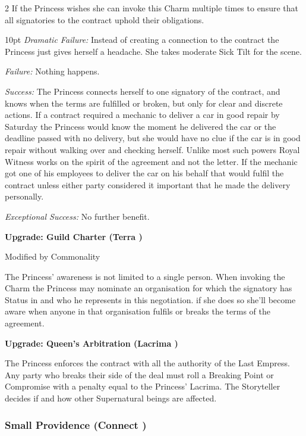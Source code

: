\begin{multicols}{2}
If the Princess wishes she can invoke this Charm multiple times to ensure that all signatories to the contract uphold their obligations. 

\begin{myindentpar}{10pt}    \emph{Dramatic Failure:} Instead of creating a connection to the contract the Princess just gives herself a headache. She takes moderate Sick Tilt for the scene. 

\emph{Failure:} Nothing happens. 

\emph{Success:} The Princess connects herself to one signatory of the contract, and knows when the terms are fulfilled or broken, but only for clear and discrete actions. If a contract required a mechanic to deliver a car in good repair by Saturday the Princess would know the moment he delivered the car or the deadline passed with no delivery, but she would have no clue if the car is in good repair without walking over and checking herself. Unlike most such powers Royal Witness works on the spirit of the agreement and not the letter. If the mechanic got one of his employees to deliver the car on his behalf that would fulfil the contract unless either party considered it important that he made the delivery personally. 

\emph{Exceptional Success:} No further benefit.

    \textbf{Upgrade: Guild Charter (Terra \textbullet)}
	
	Modified by Commonality
	
	The Princess' awareness is not limited to a single person. When invoking the Charm the Princess may nominate an organisation for which the signatory has Status in and who he represents in this negotiation. if she does so she'll become aware when anyone in that organisation fulfils or breaks the terms of the agreement. 
	
	\textbf{Upgrade: Queen's Arbitration (Lacrima \textbullet\textbullet\textbullet)}
	
	The Princess enforces the contract with all the authority of the Last Empress. Any party who breaks their side of the deal must roll a Breaking Point or Compromise with a penalty equal to the Princess' Lacrima. The Storyteller decides if and how other Supernatural beings are affected.
	
 \end{myindentpar}


\subsubsection*{Small Providence (Connect \textbullet)}


\end{multicols}
